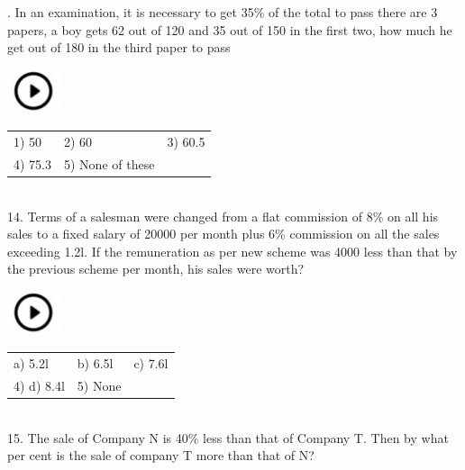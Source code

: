 \documentclass{article}
\begin{document}
. In an examination, it is necessary to get 35\% of the total to pass there are 3 papers, a boy gets 62 out of 120 and 35 out of 150 in the first two, how much he get out of 180 in the third paper to pass

\noindent 

\noindent   \includegraphics*[width=0.60in, height=0.52in]{images/image1} 
\begin{tabular}{p{1.7in} p{1.6in} p{1.6in}} \\ 
 1) 50        &   2) 60       &   3) 60.5        \\
4) 75.3   &       5) None of these\\
\end{tabular}
                                                                

\noindent 

\noindent 

\noindent \\


14. Terms of a salesman were changed from a flat commission of 8\% on all his sales to a fixed salary  of  20000  per  month  plus  6\%  commission  on  all  the  sales  exceeding  1.2l.  If  the remuneration as per new scheme was 4000 less than that by the previous scheme per month, his sales were worth?

\noindent 

\noindent   \includegraphics*[width=0.60in, height=0.52in]{images/image1}  
\begin{tabular}{p{1.7in} p{1.6in} p{1.6in}} \\ 
a) 5.2l         &   b) 6.5l      &   c) 7.6l       \\
	4) d) 8.4l    &     5) None\\
\end{tabular}
                                                          

\noindent \\
 

15. The sale of Company N is 40\% less than that of Company T. Then by what per cent is the sale of company T more than that of N?
\end{document}

